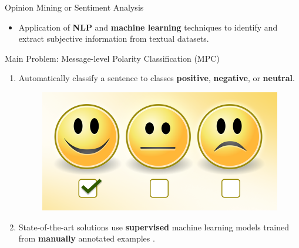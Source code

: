\documentclass[handout]{beamer}
\begin{document}
\begin{frame}{Opinion Mining or Sentiment Analysis}
\begin{scriptsize}\begin{itemize}
 \item Application of \textbf{NLP} and \textbf{machine learning} techniques to identify and extract subjective information from textual datasets.
\end{itemize}

\begin{block}{Main Problem: Message-level Polarity Classification (MPC)}
  \begin{enumerate}
   \item Automatically classify a sentence to classes \textcolor[rgb]{0.00,0.00,1.00}{\textbf{positive}}, \textcolor[rgb]{1.00,0.00,0.00}{\textbf{negative}}, or {\textbf{neutral}}. 
   
     \begin{figure}[h]
        	\includegraphics[scale = 0.15]{pics/sent.png}
        \end{figure}
   
   \item State-of-the-art solutions use \textbf{supervised} machine learning models trained from \textbf{manually} annotated examples \cite{Mohammad2013}.
  \end{enumerate} 
\end{block}

\end{scriptsize}

\end{frame}
\end{document}
